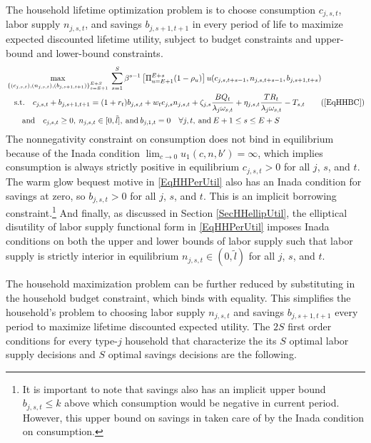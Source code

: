   The household lifetime optimization problem is to choose consumption $c_{j,s,t}$, labor supply $n_{j,s,t}$, and savings $b_{j,s+1,t+1}$ in every period of life to maximize expected discounted lifetime utility, subject to budget constraints and upper-bound and lower-bound constraints.
  \begin{align}
    &\max_{\{(c_{j,s,t}),(n_{j,s,t}),(b_{j,s+1,t+1})\}_{s=E+1}^{E+S}}\: \sum_{s=1}^S\beta^{s-1}\left[\Pi_{u=E+1}^{E+s}(1 - \rho_u)\right]u(c_{j,s,t+s-1},n_{j,s,t+s-1},b_{j,s+1,t+s}) \label{EqHHmaxprob} \\
    &\quad\text{s.t.}\quad c_{j,s,t} + b_{j,s+1,t+1} = (1 + r_{t})b_{j,s,t} + w_t e_{j,s} n_{j,s,t} + \zeta_{j,s}\frac{BQ_t}{\lambda_j\omega_{s,t}} + \eta_{j,s,t}\frac{TR_{t}}{\lambda_j\omega_{s,t}} - T_{s,t} \tag{\ref{EqHHBC}} \\
    &\qquad\text{and}\quad c_{j,s,t}\geq 0,\: n_{j,s,t} \in[0,\tilde{l}],\:\text{and}\: b_{j,1,t}=0 \quad\forall j, t, \:\text{and}\: E+1\leq s\leq E+S \nonumber
  \end{align}
  The nonnegativity constraint on consumption does not bind in equilibrium because of the Inada condition $\lim_{c\rightarrow 0}u_1(c,n,b') = \infty$, which implies consumption is always strictly positive in equilibrium $c_{j,s,t}>0$ for all $j$, $s$, and $t$. The warm glow bequest motive in \eqref{EqHHPerUtil} also has an Inada condition for savings at zero, so $b_{j,s,t}>0$ for all $j$, $s$, and $t$. This is an implicit borrowing constraint.\footnote{It is important to note that savings also has an implicit upper bound $b_{j,s,t}\leq k$ above which consumption would be negative in current period. However, this upper bound on savings in taken care of by the Inada condition on consumption.} And finally, as discussed in Section \ref{SecHHellipUtil}, the elliptical disutility of labor supply functional form in \eqref{EqHHPerUtil} imposes Inada conditions on both the upper and lower bounds of labor supply such that labor supply is strictly interior in equilibrium $n_{j,s,t}\in(0,\tilde{l})$ for all $j$, $s$, and $t$.

  The household maximization problem can be further reduced by substituting in the household budget constraint, which binds with equality. This simplifies the household's problem to choosing labor supply $n_{j,s,t}$ and savings $b_{j,s+1,t+1}$ every period to maximize lifetime discounted expected utility. The $2S$ first order conditions for every type-$j$ household that characterize the its $S$ optimal labor supply decisions and $S$ optimal savings decisions are the following.

